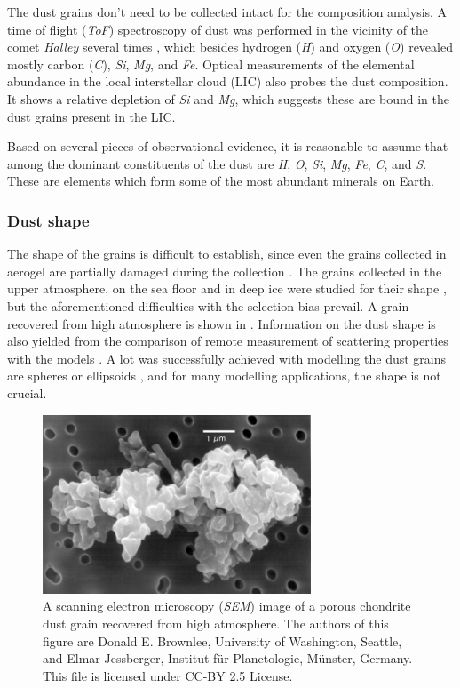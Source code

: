 The dust grains don't need to be collected intact for the composition analysis. A time of flight (\textit{ToF}) spectroscopy of dust was performed in the vicinity of the comet \textit{Halley} several times \citep{jessberger1988aspects}, which besides hydrogen (\textit{H}) and oxygen (\textit{O}) revealed mostly carbon (\textit{C}), \textit{Si}, \textit{Mg}, and \textit{Fe}. Optical measurements of the elemental abundance in the local interstellar cloud (LIC) also probes the dust composition. It shows a relative depletion of \textit{Si} and \textit{Mg}, which suggests these are bound in the dust grains present in the LIC. 

Based on several pieces of observational evidence, it is reasonable to assume that among the dominant constituents of the dust are \textit{H}, \textit{O}, \textit{Si}, \textit{Mg}, \textit{Fe}, \textit{C}, and \textit{S}. These are elements which form some of the most abundant minerals on Earth.

\subsubsection{Dust shape}

The shape of the grains is difficult to establish, since even the grains collected in aerogel are partially damaged during the collection \citep{burchell2006cosmic}. The grains collected in the upper atmosphere, on the sea floor and in deep ice were studied for their shape \citep{jessberger2001properties}, but the aforementioned difficulties with the selection bias prevail. A grain recovered from high atmosphere is shown in . Information on the dust shape is also yielded from the comparison of remote measurement of scattering properties with the models \citep{min2005modeling}. A lot was successfully achieved with modelling the dust grains are spheres or ellipsoids \citep{mann2010interstellar}, and for many modelling applications, the shape is not crucial.

\begin{figure}[h]
 	\centering
 	\includegraphics[width=8cm]{figures/grain.jpg}
 	\caption{A scanning electron microscopy (\textit{SEM}) image of a porous chondrite dust grain recovered from high atmosphere.  The authors of this figure are Donald E. Brownlee, University of Washington, Seattle, and Elmar Jessberger, Institut für Planetologie, Münster, Germany.
This file is licensed under CC-BY 2.5 License.}
 	\label{fig:dust_grain}
\end{figure}

